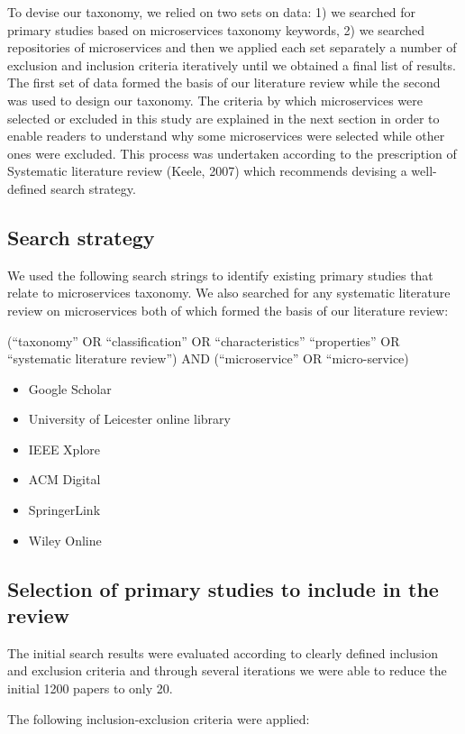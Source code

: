 \documentclass{article}
\begin{document}
To devise our taxonomy, we relied on two sets on data: 1) we searched for primary studies based on microservices taxonomy keywords, 2) we searched repositories of microservices and then we applied each set separately a number of exclusion and inclusion criteria iteratively until we obtained a final list of results. The first set of data formed the basis of our literature review while the second was used to design our taxonomy. The criteria by which microservices were selected or excluded in this study are explained in the next section in order to enable readers to understand why some microservices were selected while other ones were excluded. This process was undertaken according to the prescription of Systematic literature review (Keele, 2007) which recommends devising a well-defined search strategy.


\subsection{Search strategy}


We used the following search strings to identify existing primary studies that relate to microservices taxonomy. We also searched for any systematic literature review on microservices both of which formed the basis of our literature review:


(“taxonomy” OR “classification” OR “characteristics” “properties” OR “systematic literature review”) AND (“microservice” OR “micro-service)


\begin{itemize}
\item Google Scholar
\item University of Leicester online library
\item IEEE Xplore
\item ACM Digital
\item SpringerLink
\item Wiley Online
\end{itemize}

\subsection{Selection of primary studies to include in the review}

The initial search results were evaluated according to clearly defined inclusion and exclusion criteria and through several iterations we were able to reduce the initial 1200 papers to only 20.

The following inclusion-exclusion criteria were applied:
\end{document}
